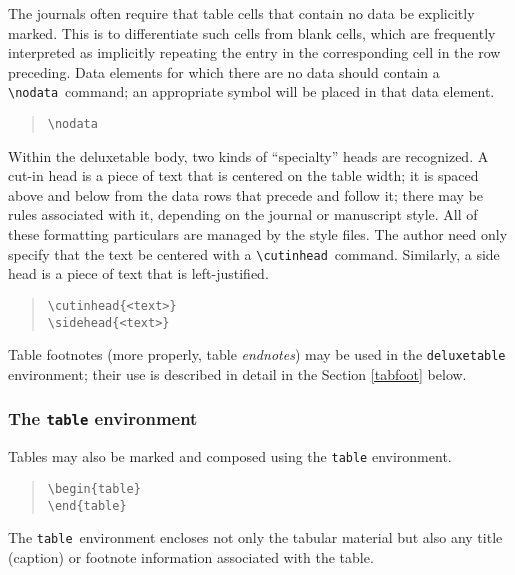\documentclass[preprint2]{aastex}
\begin{document}
The journals often require that table cells that contain  no data 
be explicitly marked.  This is to differentiate such cells from 
blank cells, which are frequently interpreted as implicitly 
repeating the entry in the corresponding cell in the row preceding. 
Data elements for which there are no data should contain 
a \verb"\nodata"\ 
 command; an appropriate symbol will be placed in 
that data element. 
\begin{quote} 
\begin{verbatim} 
\nodata 
\end{verbatim} 
\end{quote} 
 
Within the deluxetable body, two kinds of ``specialty'' heads are 
recognized.  A cut-in head is a piece of text that is centered on the 
table width; 
it is spaced above and below from the data rows that precede and 
follow it; there may be rules associated with it, depending on the 
journal or manuscript style.  All of these formatting particulars 
are managed by the style files.  The author need only specify that the 
text be centered with a \verb"\cutinhead"\ 
 command. 
Similarly, a side head is a piece of text that is left-justified. 
 
\begin{quote} 
\begin{verbatim} 
\cutinhead{<text>} 
\sidehead{<text>} 
\end{verbatim} 
\end{quote} 
 
Table footnotes (more properly, table \emph{endnotes}) 
may be used in the \texttt{deluxetable} environment; 
their use is described in detail in the Section 
 \ref{tabfoot} below. 
 
\subsubsection{The {\tt table} environment} 
 
Tables may also be marked and composed using the \texttt{table} environment. 
\begin{quote} 
\begin{verbatim} 
\begin{table} 
\end{table} 
\end{verbatim} 
\end{quote} 
The 
\texttt{table}\ environment 
encloses not only the tabular 
material but also any title (caption) or footnote information 
associated with the table. 
 
\end{document}
